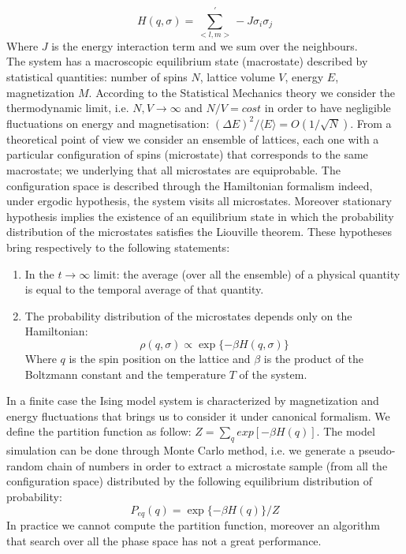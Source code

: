 \documentclass[11pt,a4paper]{article}
\begin{document}
\begin{equation}
H(q, \sigma) = \sum_{<l,m>}^{'} -J\sigma_i\sigma_j 
\end{equation}
Where $J$ is the energy interaction term and we sum over the neighbours.
\\
The system has  a macroscopic equilibrium state (macrostate) described by statistical quantities: number of spins $N$, lattice volume $V$, energy $E$, magnetization $M$. According to the Statistical Mechanics theory we consider the thermodynamic limit, i.e. $N, V \rightarrow \infty$ and $N/V = cost$ in order to have negligible fluctuations on energy and magnetisation: $(\Delta E)^2 / \langle E \rangle = O  (1/ \sqrt{N}) $.
From a theoretical point of view we consider an ensemble of lattices, each one with a particular configuration of spins (microstate) that corresponds to the same macrostate; we underlying that all microstates are equiprobable. The configuration space is described through the Hamiltonian formalism indeed, under ergodic hypothesis, the system visits all microstates. Moreover stationary hypothesis implies the existence of an equilibrium state in which  the probability distribution of the microstates satisfies the Liouville theorem. These hypotheses bring respectively to the following statements:

\begin{enumerate}
\item In the $t \rightarrow \infty$ limit: the average (over all the ensemble) of a physical quantity is equal to the temporal average of that quantity.
\item The probability distribution of the microstates depends only on the Hamiltonian:
\begin{equation}
\rho (q, \sigma ) \propto \exp \lbrace- \beta H(q, \sigma ) \rbrace 
\end{equation}
Where $q$ is the spin position on the lattice and $\beta$ is the product of the Boltzmann constant and the temperature $T$ of the system.
\end{enumerate}


In a finite case the Ising model system is characterized by magnetization and  energy fluctuations that brings us to consider it under canonical formalism. We define the partition function as follow: $Z = \sum_q exp [  -\beta H(q) ]$. The model simulation can be done through Monte Carlo method, i.e. we generate a pseudo-random chain of numbers in order to extract a microstate sample (from all the configuration space) distributed by the following equilibrium distribution of probability:
\begin{equation}
P_{eq}(q)=\exp \lbrace -\beta H(q)\rbrace /Z
\end{equation} 
In practice we cannot compute the partition function, moreover an algorithm that search over all the phase space has not a great performance. 
\end{document}
